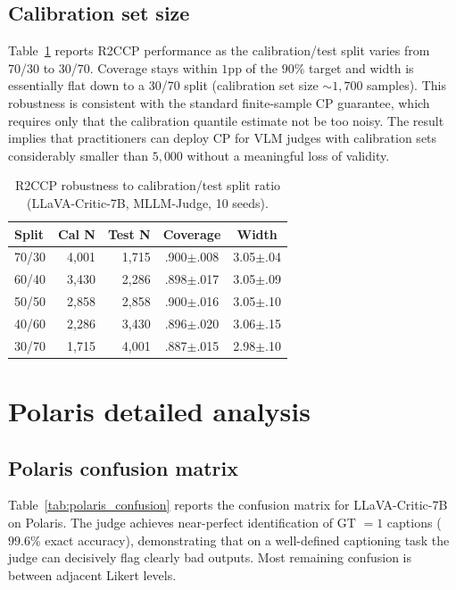 \documentclass{article}
\begin{document}
\subsection{Calibration set size}
\label{app:split}

Table~\ref{tab:ablation_split} reports R2CCP performance as the calibration/test split varies from 70/30 to 30/70. Coverage stays within $1$pp of the $90\%$ target and width is essentially flat down to a 30/70 split (calibration set size $\sim 1{,}700$ samples). This robustness is consistent with the standard finite-sample CP guarantee, which requires only that the calibration quantile estimate not be too noisy. The result implies that practitioners can deploy CP for VLM judges with calibration sets considerably smaller than $5{,}000$ without a meaningful loss of validity.

\begin{table}[t]
\centering
\caption{R2CCP robustness to calibration/test split ratio (LLaVA-Critic-7B, MLLM-Judge, 10 seeds).}
\label{tab:ablation_split}
\small
\begin{tabular}{lrrcc}
\toprule
\textbf{Split} & \textbf{Cal N} & \textbf{Test N} & \textbf{Coverage} & \textbf{Width} \\
\midrule
70/30 & 4{,}001 & 1{,}715 & .900$\pm$.008 & 3.05$\pm$.04 \\
60/40 & 3{,}430 & 2{,}286 & .898$\pm$.017 & 3.05$\pm$.09 \\
50/50 & 2{,}858 & 2{,}858 & .900$\pm$.016 & 3.05$\pm$.10 \\
40/60 & 2{,}286 & 3{,}430 & .896$\pm$.020 & 3.06$\pm$.15 \\
30/70 & 1{,}715 & 4{,}001 & .887$\pm$.015 & 2.98$\pm$.10 \\
\bottomrule
\end{tabular}
\end{table}

\section{Polaris detailed analysis}
\label{app:polaris_full}

\subsection{Polaris confusion matrix}

Table~\ref{tab:polaris_confusion} reports the confusion matrix for LLaVA-Critic-7B on Polaris. The judge achieves near-perfect identification of GT $= 1$ captions ($99.6\%$ exact accuracy), demonstrating that on a well-defined captioning task the judge can decisively flag clearly bad outputs. Most remaining confusion is between adjacent Likert levels.
\end{document}
